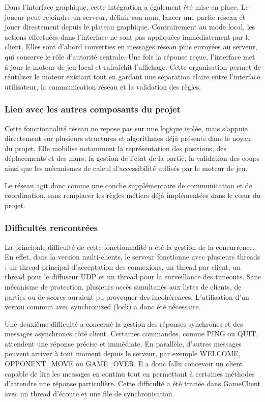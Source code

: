 \documentclass[a4paper]{article}
\begin{document}
Dans l’interface graphique, cette intégration a également été mise en place. Le joueur peut rejoindre un serveur, définir son nom, lancer une partie réseau et jouer directement depuis le plateau graphique. Contrairement au mode local, les actions effectuées dans l’interface ne sont pas appliquées immédiatement par le client. Elles sont d’abord converties en messages réseau puis envoyées au serveur, qui conserve le rôle d’autorité centrale. Une fois la réponse reçue, l’interface met à jour le moteur de jeu local et rafraîchit l’affichage. Cette organisation permet de réutiliser le moteur existant tout en gardant une séparation claire entre l’interface utilisateur, la communication réseau et la validation des règles.

\subsubsection{Lien avec les autres composants du projet}
Cette fonctionnalité réseau ne repose pas sur une logique isolée, mais s’appuie directement sur plusieurs structures et algorithmes déjà présents dans le noyau du projet. Elle mobilise notamment la représentation des positions, des déplacements et des murs, la gestion de l’état de la partie, la validation des coups ainsi que les mécanismes de calcul d’accessibilité utilisés par le moteur de jeu.

Le réseau agit donc comme une couche supplémentaire de communication et de coordination, sans remplacer les règles métiers déjà implémentées dans le cœur du projet.


\subsubsection{Difficultés rencontrées}

La principale difficulté de cette fonctionnalité a été la gestion de la
concurrence. En effet, dans la version multi-clients, le serveur
fonctionne avec plusieurs threads : un thread principal d’acceptation
des connexions, un thread par client, un thread pour le diffuseur UDP
et un thread pour la surveillance des timeouts. Sans mécanisme de
protection, plusieurs accès simultanés aux listes de clients, de parties
ou de scores auraient pu provoquer des incohérences. L’utilisation
d’un verrou commun avec synchronized (lock) a donc été nécessaire.

Une deuxième difficulté a concerné la gestion des réponses synchrones
et des messages asynchrones côté client. Certaines commandes, comme PING
ou QUIT, attendent une réponse précise et immédiate. En parallèle,
d’autres messages peuvent arriver à tout moment depuis le serveur, par
exemple WELCOME, OPPONENT\_MOVE ou GAME\_OVER. Il a donc fallu concevoir
un client capable de lire les messages en continu tout en permettant à
certaines méthodes d’attendre une réponse particulière. Cette difficulté
a été traitée dans GameClient avec un thread d’écoute et une file de
synchronisation.
\end{document}
